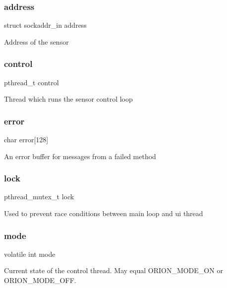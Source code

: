 \subsubsection{\texorpdfstring{address}{address}}
{\footnotesize\ttfamily struct sockaddr\+\_\+in address}

Address of the sensor \mbox{\label{struct_orion_a60e242a7925447f8aa006a5126e7d100}} 
\subsubsection{\texorpdfstring{control}{control}}
{\footnotesize\ttfamily pthread\+\_\+t control}

Thread which runs the sensor control loop \mbox{\label{struct_orion_a2934b458b7d1f80c5034b207fcd05c31}} 
\subsubsection{\texorpdfstring{error}{error}}
{\footnotesize\ttfamily char error\mbox{[}128\mbox{]}}

An error buffer for messages from a failed method \mbox{\label{struct_orion_a0abaf4b5d42c4e5d19190035fade3599}} 
\subsubsection{\texorpdfstring{lock}{lock}}
{\footnotesize\ttfamily pthread\+\_\+mutex\+\_\+t lock}

Used to prevent race conditions between main loop and ui thread \mbox{\label{struct_orion_afa9d6911164917fd0b12dbdf0df0ff3a}} 
\subsubsection{\texorpdfstring{mode}{mode}}
{\footnotesize\ttfamily volatile int mode}

Current state of the control thread. May equal O\+R\+I\+O\+N\+\_\+\+M\+O\+D\+E\+\_\+\+ON or O\+R\+I\+O\+N\+\_\+\+M\+O\+D\+E\+\_\+\+O\+FF. \mbox{\label{struct_orion_adf42a979321286885fe5a447d48d14d6}} 
